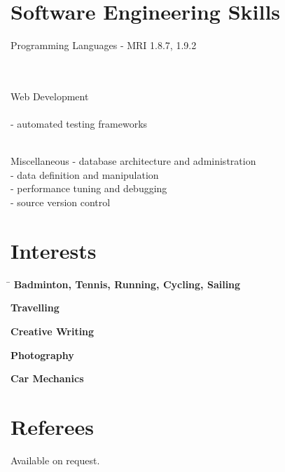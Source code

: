 \documentclass{article}
\begin{document}
\section*{Software Engineering Skills}

\begin{skillgroup}{Programming Languages}%
	 - MRI 1.8.7, 1.9.2\\
	\\
	\\
\end{skillgroup}

\begin{skillgroup}{Web Development}%
  \\
	\\
	 - automated testing frameworks\\
	\\
\end{skillgroup}

\begin{skillgroup}{Miscellaneous}%
	 - database architecture and administration\\
	 - data definition and manipulation\\
	 - performance tuning and debugging\\
	 - source version control
\end{skillgroup}


\section*{Interests}

\begin{tabbing}
\hspace{5mm} \= \kill
\sqbullet \> \textbf{Badminton, Tennis, Running, Cycling, Sailing} \\
\rule{0mm}{4mm}\sqbullet \> \textbf{Travelling}\\
\rule{0mm}{4mm}\sqbullet \> \textbf{Creative Writing} \\
\rule{0mm}{4mm}\sqbullet \> \textbf{Photography} \\
\rule{0mm}{4mm}\sqbullet \> \textbf{Car Mechanics} \\

\end{tabbing}


\section*{Referees}

Available on request.
\end{document}

